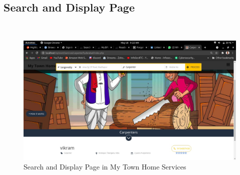 \documentclass[12pt,a4paper]{report}
\begin{document}
\begin{titlepage}
{{\newpage
\section{ Search and Display Page}\\[3.0cm]
\begin{figure}[h!]
	\begin{center}
		 \includegraphics[width=1.0\linewidth,height=0.5\textheight]{car.jpeg}
	\end{center}
	\caption{Search and Display Page in My Town Home Services}
\end{figure}
\newpage

\textbf{ }\textbf{ }\textbf{ }\textbf{ }\textbf{ }\textbf{ }\textbf{ }\textbf{ }
}}
\end{titlepage}
\end{document}
